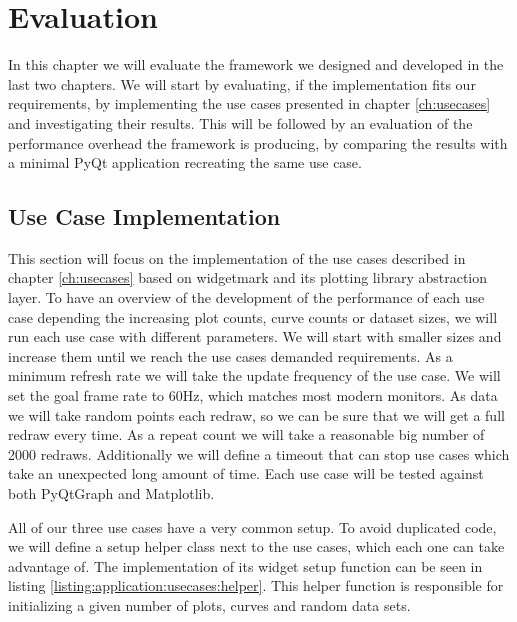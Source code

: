 
\chapter{Evaluation}
\label{ch:evaluation}

In this chapter we will evaluate the framework we designed and developed in the
last two chapters. We will start by evaluating, if the implementation fits our
requirements, by implementing the use cases presented in chapter
\ref{ch:usecases} and investigating their results. This will be followed by an
evaluation of the performance overhead the framework is producing, by comparing
the results with a minimal PyQt application recreating the same use case.


\section{Use Case Implementation}

This section will focus on the implementation of the use cases described in
chapter \ref{ch:usecases} based on widgetmark and its plotting library
abstraction layer. To have an overview of the development of the performance
of each use case depending the increasing plot counts, curve counts or dataset
sizes, we will run each use case with different parameters. We will start with
smaller sizes and increase them until we reach the use cases demanded
requirements. As a minimum refresh rate we will take the update frequency of the
use case. We will set the goal frame rate to 60Hz, which matches most modern
monitors. As data we will take random points each redraw, so we can be sure that
we will get a full redraw every time. As a repeat count we will take a
reasonable big number of 2000 redraws. Additionally we will define a timeout
that can stop use cases which take an unexpected long amount of time. Each use
case will be tested against both PyQtGraph and Matplotlib.

All of our three use cases have a very common setup. To avoid duplicated code,
we will define a setup helper class next to the use cases, which each one can
take advantage of. The implementation of its widget setup function can be seen
in listing \ref{listing:application:usecases:helper}. This helper function is
responsible for initializing a given number of plots, curves and random data
sets.


